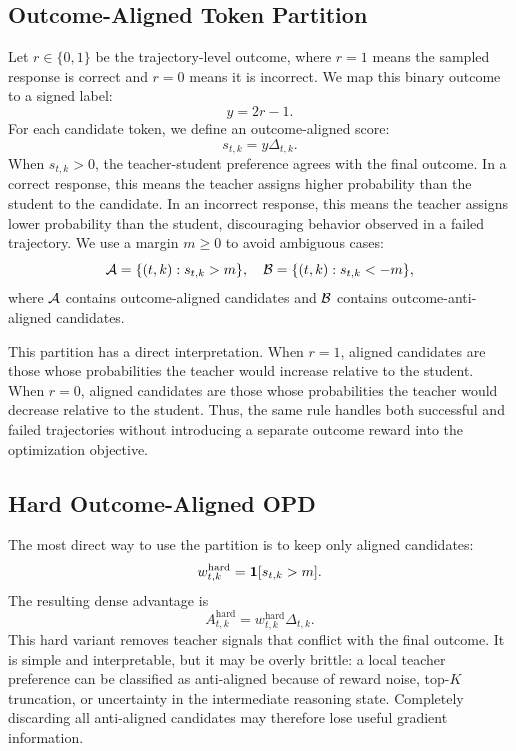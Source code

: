 \documentclass[letterpaper]{article} %
\begin{document}
\subsection{Outcome-Aligned Token Partition}

Let $r \in \{0,1\}$ be the trajectory-level outcome, where $r=1$ means the sampled response is correct and $r=0$ means it is incorrect. We map this binary outcome to a signed label:
\begin{equation}
y = 2r - 1.
\end{equation}
For each candidate token, we define an outcome-aligned score:
\begin{equation}
s_{t,k}= y \Delta_{t,k}.
\end{equation}
When $s_{t,k}>0$, the teacher-student preference agrees with the final outcome. In a correct response, this means the teacher assigns higher probability than the student to the candidate. In an incorrect response, this means the teacher assigns lower probability than the student, discouraging behavior observed in a failed trajectory. We use a margin $m \geq 0$ to avoid ambiguous cases:
\begin{equation}
{\cal A} = \{(t,k): s_{t,k}>m\},
\quad
{\cal B} = \{(t,k): s_{t,k}<-m\},
\end{equation}
where ${\cal A}$ contains outcome-aligned candidates and ${\cal B}$ contains outcome-anti-aligned candidates.

This partition has a direct interpretation. When $r=1$, aligned candidates are those whose probabilities the teacher would increase relative to the student. When $r=0$, aligned candidates are those whose probabilities the teacher would decrease relative to the student. Thus, the same rule handles both successful and failed trajectories without introducing a separate outcome reward into the optimization objective.

\subsection{Hard Outcome-Aligned OPD}

The most direct way to use the partition is to keep only aligned candidates:
\begin{equation}
w^{\mathrm{hard}}_{t,k}
=
{\bf 1}[s_{t,k}>m].
\end{equation}
The resulting dense advantage is
\begin{equation}
A^{\mathrm{hard}}_{t,k}
=
w^{\mathrm{hard}}_{t,k}\Delta_{t,k}.
\end{equation}
This hard variant removes teacher signals that conflict with the final outcome. It is simple and interpretable, but it may be overly brittle: a local teacher preference can be classified as anti-aligned because of reward noise, top-$K$ truncation, or uncertainty in the intermediate reasoning state. Completely discarding all anti-aligned candidates may therefore lose useful gradient information.
\end{document}
